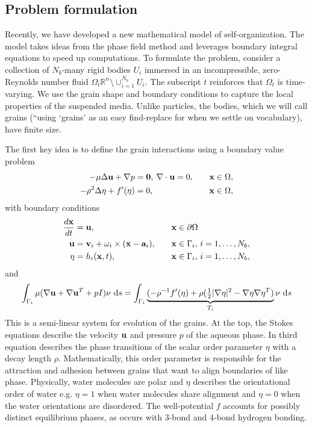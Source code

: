 \subsection{Problem formulation}
Recently, we have developed a new mathematical model of self-organization.
The model takes ideas from the phase field method 
and leverages boundary integral equations to speed up computations.
To formulate the problem, consider a collection of $N_b$-many rigid bodies
$U_i$ immersed in an incompressible, zero-Reynolds number fluid
$\Omega_t \mathbb{R}^n \setminus \cup_{i=1}^{N_b} U_i$.
The subscript $t$ reinforces that $\Omega_t$ is time-varying. 
We use the grain shape and boundary conditions to capture the local 
properties of the suspended media.
Unlike particles, the bodies, which we will call grains (``using `grains' as an easy find-replace for
when we settle on vocabulary), have finite size.

The first key idea is to define the grain interactions using a boundary
value problem
\begin{alignat}{3}
  -\mu\Delta \mathbf{u} + \nabla p &= \mathbf{0}, \:
  \nabla \cdot \mathbf{u} = 0, \quad &&\mathbf{x} \in \Omega, \label {eqn:stokes} \\
  -\rho^2 \Delta \eta + f'(\eta) &= 0, &&\mathbf{x} \in \Omega,
  \label{eqn:phase}
\end{alignat}
with boundary conditions
\begin{alignat}{3}
  \frac{d\mathbf{x}}{dt} &= \mathbf{u}, &&\mathbf{x} \in \partial\Omega \\
  \mathbf{u} &= \mathbf{v}_i + \omega_i \times (\mathbf{x} - \mathbf{a}_i), \quad &&\mathbf{x} \in
  \Gamma_i,\, i=1,\ldots,N_b, \\
  \eta &= h_i(\mathbf{x},t),  &&\mathbf{x} \in \Gamma_i,\, i=1,\ldots,N_b,
\end{alignat}
and
\begin{equation}
\int_{\Gamma_i} \mu(\nabla \uu + \nabla \uu^T + pI)\nu \,\dif s = 
\int_{\Gamma_i}
\underbrace{(-\rho^{-1} f'(\eta)
  + \rho(\tfrac{1}{2}|\nabla \eta|^2 - \nabla \eta \nabla \eta^T)}_{T_i} \nu \, \dif s
\end{equation}
This is a semi-linear system for evolution of the grains.  At the top,
the Stokes equations describe the velocity $\mathbf{u}$ and pressure $p$ of the
aqueous phase. In third equation describes the phase transitions of the
scalar order parameter $\eta$ with a decay length $\rho.$
Mathematically, this order parameter is responsible for the attraction
and adhesion between grains that want to align boundaries of like phase.  
Physically, water molecules are polar and $\eta$ describes the orientational
order of water e.g. $\eta = 1$ when water molecules share alignment
and $\eta = 0$ when the water orientations are disordered.
The well-potential $f$ accounts for possibly distinct equilibrium phases,
as occurs with 3-bond and 4-bond hydrogen bonding.

